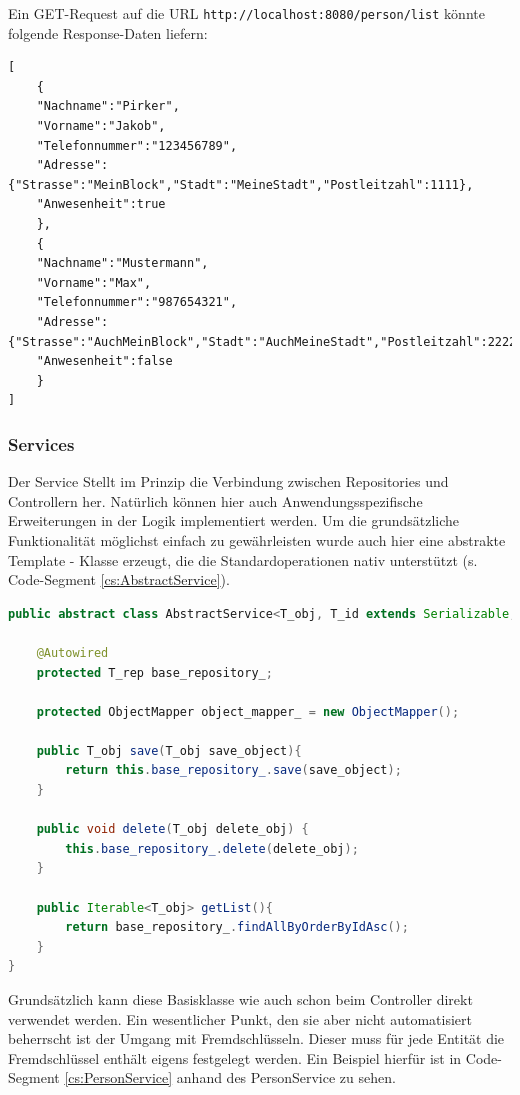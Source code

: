 Ein GET-Request auf die URL \verb|http://localhost:8080/person/list| könnte folgende Response-Daten liefern:

\scriptsize
\begin{lstlisting}
[
	{	
	"Nachname":"Pirker",
	"Vorname":"Jakob",
	"Telefonnummer":"123456789",
	"Adresse":{"Strasse":"MeinBlock","Stadt":"MeineStadt","Postleitzahl":1111},
	"Anwesenheit":true
	},
	{	
	"Nachname":"Mustermann",
	"Vorname":"Max",
	"Telefonnummer":"987654321",
	"Adresse":{"Strasse":"AuchMeinBlock","Stadt":"AuchMeineStadt","Postleitzahl":2222},
	"Anwesenheit":false
	}
]
\end{lstlisting}
\normalsize

\subsubsection{Services}
Der Service Stellt im Prinzip die Verbindung zwischen Repositories und Controllern her. Natürlich können hier auch Anwendungsspezifische Erweiterungen in der Logik implementiert werden. Um die grundsätzliche Funktionalität möglichst einfach zu gewährleisten wurde auch hier eine abstrakte Template - Klasse erzeugt, die die Standardoperationen nativ unterstützt (s. Code-Segment \ref{cs:AbstractService}).

\scriptsize
\begin{lstlisting}[caption=AbstractService.java, label=cs:AbstractService, language=Java]
public abstract class AbstractService<T_obj, T_id extends Serializable, T_rep extends AbstractRepository<T_obj, T_id>> implements AbstractServiceInterface<T_obj>{

	@Autowired
	protected T_rep base_repository_;
	
	protected ObjectMapper object_mapper_ = new ObjectMapper();
	
	public T_obj save(T_obj save_object){
		return this.base_repository_.save(save_object);
	}
	
	public void delete(T_obj delete_obj) { 
		this.base_repository_.delete(delete_obj);
	}
	
	public Iterable<T_obj> getList(){
		return base_repository_.findAllByOrderByIdAsc();
	}
}
\end{lstlisting}
\normalsize

Grundsätzlich kann diese Basisklasse wie auch schon beim Controller direkt verwendet werden. Ein wesentlicher Punkt, den sie aber nicht automatisiert beherrscht ist der Umgang mit Fremdschlüsseln. Dieser muss für jede Entität die Fremdschlüssel enthält eigens festgelegt werden. Ein Beispiel hierfür ist in Code-Segment \ref{cs:PersonService} anhand des PersonService zu sehen.


